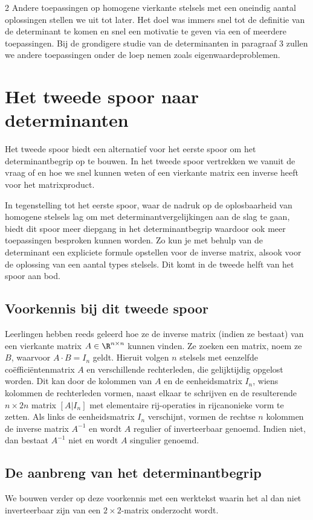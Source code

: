 \begin{multicols}{2}
    Andere toepassingen op homogene vierkante stelsels met een oneindig aantal oplossingen stellen we uit tot later. Het doel was immers snel tot de definitie van de determinant te komen en snel een motivatie te geven via een of meerdere toepassingen. Bij de grondigere studie van de determinanten in paragraaf 3 zullen we andere toepassingen onder de loep nemen zoals eigenwaardeproblemen.

   


	\section{Het tweede spoor naar determinanten}
	Het tweede spoor biedt een alternatief voor het eerste spoor om het determinantbegrip op te bouwen. In het tweede spoor vertrekken we vanuit de vraag of en hoe we snel kunnen weten of een vierkante matrix een inverse heeft voor het matrixproduct. 
 
 In tegenstelling tot het eerste spoor, waar de nadruk op de oplosbaarheid van homogene stelsels lag om met determinantvergelijkingen aan de slag te gaan, biedt dit spoor meer diepgang in het determinantbegrip waardoor ook meer toepassingen besproken kunnen worden. Zo kun je met behulp van de determinant een expliciete formule opstellen voor de inverse matrix, alsook voor de oplossing van een aantal types stelsels. Dit komt in de tweede helft van het spoor aan bod.
 
 \subsection{Voorkennis bij dit tweede spoor}
 Leerlingen hebben reeds geleerd hoe ze de inverse matrix (indien ze bestaat) van een vierkante matrix $A \in \R^{n\times n}$ kunnen vinden. Ze zoeken een matrix, noem ze $B$, waarvoor $A\cdot B = I_n$ geldt. Hieruit volgen $n$ stelsels met eenzelfde co\"effici\"entenmatrix $A$ en verschillende rechterleden, die gelijktijdig opgelost worden. Dit kan door de kolommen van $A$ en de eenheidsmatrix $I_n$, wiens kolommen de rechterleden vormen, naast elkaar te schrijven en de resulterende $n\times 2n$  matrix $[A|I_n]$ met elementaire rij-operaties in rijcanonieke vorm te zetten. Als links de eenheidsmatrix $I_n$ verschijnt, vormen de rechtse $n$ kolommen de inverse matrix $A^{-1}$ en wordt $A$ regulier of inverteerbaar genoemd. Indien niet, dan bestaat $A^{-1}$ niet en wordt $A$ singulier genoemd. 

 \subsection{De aanbreng van het determinantbegrip}
 We bouwen verder op deze voorkennis met een werktekst waarin het al dan niet inverteerbaar zijn van een $2\times 2$-matrix onderzocht wordt.

\end{multicols}
